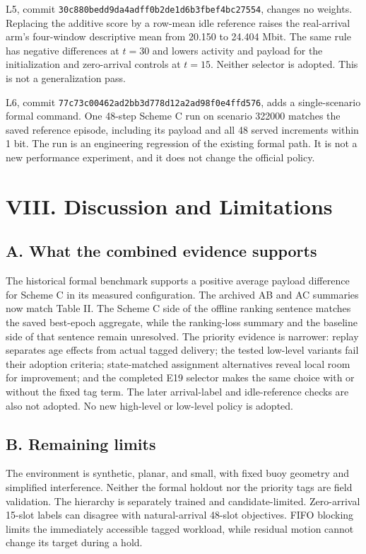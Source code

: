 L5, commit \nolinkurl{30c880bedd9da4adff0b2de1d6b3fbef4bc27554}, changes no weights. Replacing the additive score by a row-mean idle reference raises the real-arrival arm's four-window descriptive mean from 20.150 to 24.404 Mbit. The same rule has negative differences at $t=30$ and lowers activity and payload for the initialization and zero-arrival controls at $t=15$. Neither selector is adopted. This is not a generalization pass.

L6, commit \nolinkurl{77c73c00462ad2bb3d778d12a2ad98f0e4ffd576}, adds a single-scenario formal command. One 48-step Scheme C run on scenario 322000 matches the saved reference episode, including its payload and all 48 served increments within 1 bit. The run is an engineering regression of the existing formal path. It is not a new performance experiment, and it does not change the official policy.

\section*{VIII. Discussion and Limitations}

\subsection*{A. What the combined evidence supports}

The historical formal benchmark supports a positive average payload difference for Scheme C in its measured configuration. The archived AB and AC summaries now match Table II. The Scheme C side of the offline ranking sentence matches the saved best-epoch aggregate, while the ranking-loss summary and the baseline side of that sentence remain unresolved. The priority evidence is narrower: replay separates age effects from actual tagged delivery; the tested low-level variants fail their adoption criteria; state-matched assignment alternatives reveal local room for improvement; and the completed E19 selector makes the same choice with or without the fixed tag term. The later arrival-label and idle-reference checks are also not adopted. No new high-level or low-level policy is adopted.

\subsection*{B. Remaining limits}

The environment is synthetic, planar, and small, with fixed buoy geometry and simplified interference. Neither the formal holdout nor the priority tags are field validation. The hierarchy is separately trained and candidate-limited. Zero-arrival 15-slot labels can disagree with natural-arrival 48-slot objectives. FIFO blocking limits the immediately accessible tagged workload, while residual motion cannot change its target during a hold.

